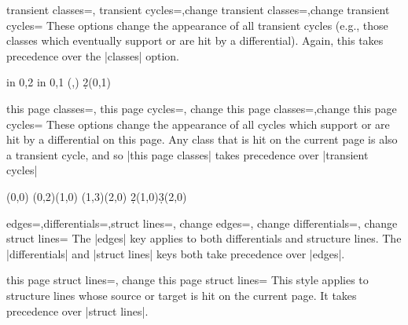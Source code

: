 \documentclass{ltxdoc}
\begin{document}
\begin{sseqdata}[name=ex1,degree={#1}{1-#1}]
\begin{keylist}{transient classes=, transient cycles=,change transient classes=,change transient cycles=}
These options change the appearance of all transient cycles (e.g., those classes which eventually support or are hit by a differential). Again, this takes precedence over the |classes| option.
\begin{codeexample}[width=6.5cm]
\begin{sseqpage}[cohomological Serre grading, math nodes,
                 classes={draw=none}, transient cycles=red]
\foreach \x in {0,2} \foreach \y in {0,1}{
    \class["\mathbb{Z}"](\x,\y)
}
\d2(0,1)
\end{sseqpage}
\end{codeexample}
\end{keylist}

\begin{keylist}{this page classes=, this page cycles=, change this page classes=,change this page cycles=}
These options change the appearance of all cycles which support or are hit by a differential on this page. Any class that is hit on the current page is also a transient cycle, and so |this page classes| takes precedence over |transient cycles|
\begin{codeexample}[width=6cm]
\begin{sseqdata}[name=this page cycles example,Adams grading,
                 transient cycles={red,fill},this page cycles={blue}]
\class(0,0)
\class(0,2)\class(1,0)
\class(1,3)\class(2,0)
\d2(1,0)\d3(2,0)
\end{sseqdata}
\printpage[name=this page cycles example,page=2]
\hskip1cm
\printpage[name=this page cycles example,page=3]
\end{codeexample}
\end{keylist}

\begin{keylist}{edges=,differentials=,struct lines=, change edges=, change differentials=, change struct lines=}
The |edges| key applies to both differentials and structure lines. The |differentials| and |struct lines| keys both take precedence over |edges|.
\end{keylist}

\begin{keylist}{this page struct lines=, change this page struct lines=}
This style applies to structure lines whose source or target is hit on the current page. It takes precedence over |struct lines|.
\end{keylist}


\end{sseqdata}
\end{document}
